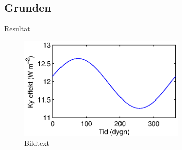 \subsection{Grunden}

\begin{frame}{Resultat}

\begin{figure}[hpbt]
\centering
\includegraphics[height=5cm]{images/foundation.eps}
\caption{\label{fig:foundation}{Bildtext}}
\end{figure}

\end{frame}